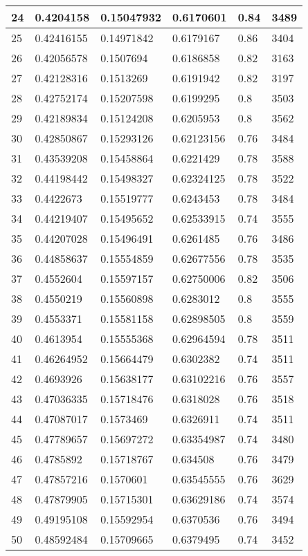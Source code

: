 \begin{longtable}{|l|l|l|l|l|l|}
24 & 0.4204158 & 0.15047932 & 0.6170601 & 0.84 & 3489 \\ \hline 
25 & 0.42416155 & 0.14971842 & 0.6179167 & 0.86 & 3404 \\ \hline 
26 & 0.42056578 & 0.1507694 & 0.6186858 & 0.82 & 3163 \\ \hline 
27 & 0.42128316 & 0.1513269 & 0.6191942 & 0.82 & 3197 \\ \hline 
28 & 0.42752174 & 0.15207598 & 0.6199295 & 0.8 & 3503 \\ \hline 
29 & 0.42189834 & 0.15124208 & 0.6205953 & 0.8 & 3562 \\ \hline 
30 & 0.42850867 & 0.15293126 & 0.62123156 & 0.76 & 3484 \\ \hline 
31 & 0.43539208 & 0.15458864 & 0.6221429 & 0.78 & 3588 \\ \hline 
32 & 0.44198442 & 0.15498327 & 0.62324125 & 0.78 & 3522 \\ \hline 
33 & 0.4422673 & 0.15519777 & 0.6243453 & 0.78 & 3484 \\ \hline 
34 & 0.44219407 & 0.15495652 & 0.62533915 & 0.74 & 3555 \\ \hline 
35 & 0.44207028 & 0.15496491 & 0.6261485 & 0.76 & 3486 \\ \hline 
36 & 0.44858637 & 0.15554859 & 0.62677556 & 0.78 & 3535 \\ \hline 
37 & 0.4552604 & 0.15597157 & 0.62750006 & 0.82 & 3506 \\ \hline 
38 & 0.4550219 & 0.15560898 & 0.6283012 & 0.8 & 3555 \\ \hline 
39 & 0.4553371 & 0.15581158 & 0.62898505 & 0.8 & 3559 \\ \hline 
40 & 0.4613954 & 0.15555368 & 0.62964594 & 0.78 & 3511 \\ \hline 
41 & 0.46264952 & 0.15664479 & 0.6302382 & 0.74 & 3511 \\ \hline 
42 & 0.4693926 & 0.15638177 & 0.63102216 & 0.76 & 3557 \\ \hline 
43 & 0.47036335 & 0.15718476 & 0.6318028 & 0.76 & 3518 \\ \hline 
44 & 0.47087017 & 0.1573469 & 0.6326911 & 0.74 & 3511 \\ \hline 
45 & 0.47789657 & 0.15697272 & 0.63354987 & 0.74 & 3480 \\ \hline 
46 & 0.4785892 & 0.15718767 & 0.634508 & 0.76 & 3479 \\ \hline 
47 & 0.47857216 & 0.1570601 & 0.63545555 & 0.76 & 3629 \\ \hline 
48 & 0.47879905 & 0.15715301 & 0.63629186 & 0.74 & 3574 \\ \hline 
49 & 0.49195108 & 0.15592954 & 0.6370536 & 0.76 & 3494 \\ \hline 
50 & 0.48592484 & 0.15709665 & 0.6379495 & 0.74 & 3452 \\ \hline 
\end{longtable}
